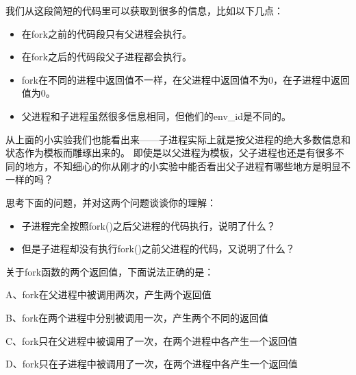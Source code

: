 我们从这段简短的代码里可以获取到很多的信息，比如以下几点：
\begin{itemize}
 \item 在fork之前的代码段只有父进程会执行。
 \item 在fork之后的代码段父子进程都会执行\label{fork与子进程}。
 \item fork在不同的进程中返回值不一样，在父进程中返回值不为0，在子进程中返回值为0。
 \item 父进程和子进程虽然很多信息相同，但他们的env\_id是不同的。
\end{itemize}

从上面的小实验我们也能看出来——子进程实际上就是按父进程的绝大多数信息和状态作为模板而雕琢出来的。
即使是以父进程为模板，父子进程也还是有很多不同的地方，不知细心的你从刚才的小实验中能否看出父子进程有哪些地方是明显不一样的吗？

\begin{thinking}\label{think-father-son}
 思考下面的问题，并对这两个问题谈谈你的理解：
  \begin{itemize}
   \item 子进程完全按照fork()之后父进程的代码执行，说明了什么？
   \item 但是子进程却没有执行fork()之前父进程的代码，又说明了什么？
  \end{itemize}
\end{thinking}


\begin{thinking}\label{think-fork的调用}
 关于fork函数的两个返回值，下面说法正确的是：

  A、fork在父进程中被调用两次，产生两个返回值

  B、fork在两个进程中分别被调用一次，产生两个不同的返回值

  C、fork只在父进程中被调用了一次，在两个进程中各产生一个返回值

  D、fork只在子进程中被调用了一次，在两个进程中各产生一个返回值
\end{thinking}




